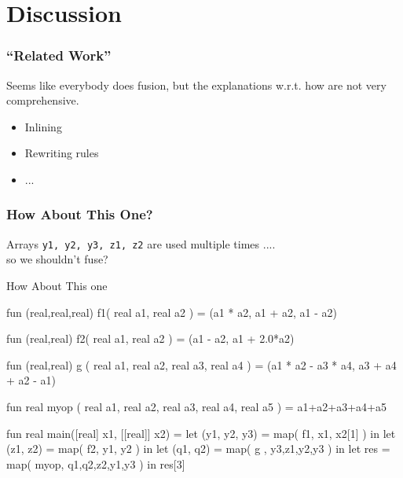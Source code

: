 \documentclass{beamer}
\newcommand{\emp}[1]{\textcolor{DikuRed}{ #1}}
\begin{document}
\section{Discussion}
\begin{frame}[fragile,t]
  \frametitle{``Related Work''}

  \emp{Seems like everybody does fusion, but the explanations w.r.t. how are not very comprehensive.}

  \begin{itemize}
    \item Inlining
    \item Rewriting rules
    \item ...
  \end{itemize}

\end{frame}


\begin{frame}[fragile,t]
  \frametitle{How About This One?}

  Arrays \texttt{y1, y2, y3, z1, z2} are used multiple times .... \\ \emp{so we shouldn't fuse?}

  \begin{block}{How About This one}
    \begin{colorcode}[fontsize=\scriptsize]
      fun (real,real,real) f1( real a1, real a2 ) =
        (a1 * a2, a1 + a2, a1 - a2)

      fun (real,real)      f2( real a1, real a2 ) =
        (a1 - a2, a1 + 2.0*a2)

      fun (real,real)      g ( real a1, real a2, real a3, real a4 ) =
        (a1 * a2 - a3 * a4, a3 + a4 + a2 - a1)

      fun real myop ( real a1, real a2, real a3, real a4, real a5 ) =
        a1+a2+a3+a4+a5

      fun real main([real] x1, [[real]] x2) =
        let (y1, y2, y3) = map( f1, x1, x2[1] )        in
        let (z1, z2)     = map( f2, y1, y2 )           in
        let (q1, q2)     = map( g , y3,z1,y2,y3 )      in
        let res          = map( myop, q1,q2,z2,y1,y3 ) in
        res[3]
    \end{colorcode}
  \end{block}

\end{frame}
\end{document}
